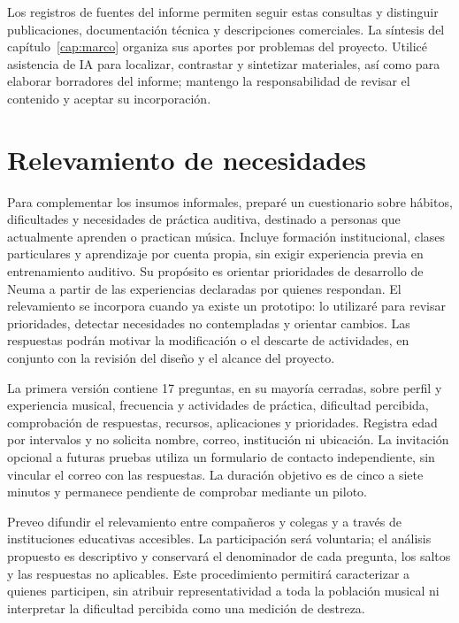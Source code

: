 Los registros de fuentes del informe permiten seguir estas consultas y distinguir
publicaciones, documentación técnica y descripciones comerciales. La síntesis
del capítulo~\ref{cap:marco} organiza sus aportes por problemas del proyecto.
Utilicé asistencia de IA para localizar, contrastar y sintetizar materiales, así
como para elaborar borradores del informe; mantengo la responsabilidad de revisar
el contenido y aceptar su incorporación.

\section{Relevamiento de necesidades}
\label{sec:metodo-encuesta}
Para complementar los insumos informales, preparé un cuestionario sobre hábitos,
dificultades y necesidades de práctica auditiva, destinado a personas que
actualmente aprenden o practican música. Incluye formación institucional,
clases particulares y aprendizaje por cuenta propia, sin exigir experiencia
previa en entrenamiento auditivo. Su propósito es orientar prioridades de
desarrollo de Neuma a partir de las experiencias declaradas por quienes respondan.
El relevamiento se incorpora cuando ya existe un prototipo: lo utilizaré para
revisar prioridades, detectar necesidades no contempladas y orientar cambios.
Las respuestas podrán motivar la modificación o el descarte de actividades,
en conjunto con la revisión del diseño y el alcance del proyecto.

La primera versión contiene 17 preguntas, en su mayoría cerradas, sobre perfil
y experiencia musical, frecuencia y actividades de práctica, dificultad percibida,
comprobación de respuestas, recursos, aplicaciones y prioridades. Registra edad
por intervalos y no solicita nombre, correo, institución ni ubicación.
La invitación opcional a futuras pruebas utiliza un formulario de contacto
independiente, sin vincular el correo con las respuestas. La duración objetivo
es de cinco a siete minutos y permanece pendiente de comprobar mediante un piloto.

Preveo difundir el relevamiento entre compañeros y colegas y a través de
instituciones educativas accesibles. La participación será voluntaria; el análisis
propuesto es descriptivo y conservará el denominador de cada pregunta, los saltos
y las respuestas no aplicables. Este procedimiento permitirá caracterizar a
quienes participen, sin atribuir representatividad a toda la población musical
ni interpretar la dificultad percibida como una medición de destreza.

